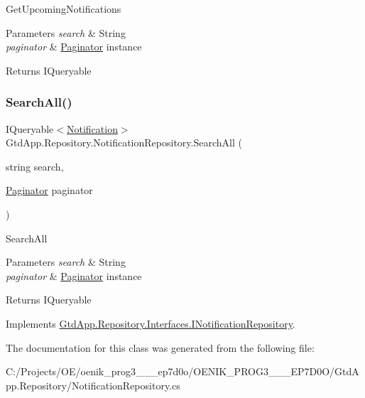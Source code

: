 Get\+Upcoming\+Notifications 


\begin{DoxyParams}{Parameters}
{\em search} & String\\
\hline
{\em paginator} & \mbox{\hyperlink{class_gtd_app_1_1_repository_1_1_paginator}{Paginator}} instance\\
\hline
\end{DoxyParams}
\begin{DoxyReturn}{Returns}
I\+Queryable
\end{DoxyReturn}
\mbox{\label{class_gtd_app_1_1_repository_1_1_notification_repository_ae7d00a78be601d51ade9419123960ec7}} 
\subsubsection{\texorpdfstring{Search\+All()}{SearchAll()}}
{\footnotesize\ttfamily I\+Queryable$<$\mbox{\hyperlink{class_gtd_app_1_1_data_1_1_notification}{Notification}}$>$ Gtd\+App.\+Repository.\+Notification\+Repository.\+Search\+All (\begin{DoxyParamCaption}\item[{string}]{search,  }\item[{\mbox{\hyperlink{class_gtd_app_1_1_repository_1_1_paginator}{Paginator}}}]{paginator }\end{DoxyParamCaption})}



Search\+All 


\begin{DoxyParams}{Parameters}
{\em search} & String\\
\hline
{\em paginator} & \mbox{\hyperlink{class_gtd_app_1_1_repository_1_1_paginator}{Paginator}} instance\\
\hline
\end{DoxyParams}
\begin{DoxyReturn}{Returns}
I\+Queryable
\end{DoxyReturn}


Implements \mbox{\hyperlink{interface_gtd_app_1_1_repository_1_1_interfaces_1_1_i_notification_repository_ace09da4279367d4edb68b6094c13d8e2}{Gtd\+App.\+Repository.\+Interfaces.\+I\+Notification\+Repository}}.



The documentation for this class was generated from the following file\+:\begin{DoxyCompactItemize}
\item 
C\+:/\+Projects/\+O\+E/oenik\+\_\+prog3\+\_\+\_\+\_\+ep7d0o/\+O\+E\+N\+I\+K\+\_\+\+P\+R\+O\+G3\+\_\+\_\+\_\+\+E\+P7\+D0\+O/\+Gtd\+App.\+Repository/Notification\+Repository.\+cs\end{DoxyCompactItemize}
